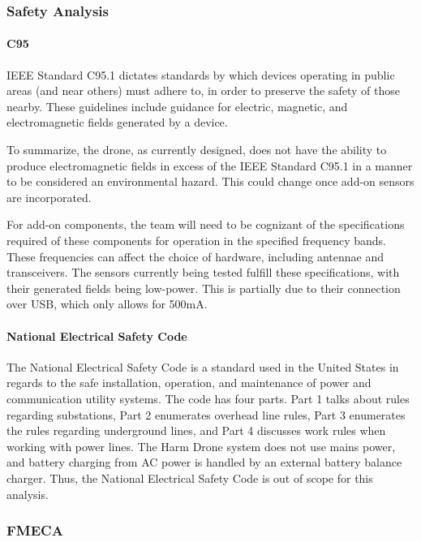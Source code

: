 \documentclass[12pt]{article}
\begin{document}
\subsubsection{Safety Analysis}
\paragraph{C95}
\par IEEE Standard C95.1 dictates standards by which devices operating in public areas (and near others) must adhere to, in order to preserve the safety of those nearby. These guidelines include guidance for electric, magnetic, and electromagnetic fields generated by a device.
\par To summarize, the drone, as currently designed, does not have the ability to produce electromagnetic fields in excess of the IEEE Standard C95.1 in a manner to be considered an environmental hazard. This could change once add-on sensors are incorporated.
\par For add-on components, the team will need to be cognizant of the specifications required of these components for operation in the specified frequency bands. These frequencies can affect the choice of hardware, including antennae and transceivers. The sensors currently being tested fulfill these specifications, with their generated fields being low-power. This is partially due to their connection over USB, which only allows for 500mA.

\paragraph{National Electrical Safety Code} The National Electrical Safety Code is a standard used in the United States in regards to the safe installation, operation, and maintenance of power and communication utility systems. The code has four parts. Part 1 talks about rules regarding substations, Part 2 enumerates overhead line rules, Part 3 enumerates the rules regarding underground lines, and Part 4 discusses work rules when working with power lines. The Harm Drone system does not use mains power, and battery charging from AC power is handled by an external battery balance charger. Thus, the National Electrical Safety Code is out of scope for this analysis.
\subsubsection{FMECA}
\end{document}
